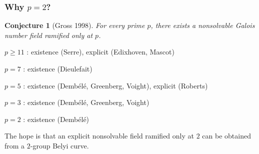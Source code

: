 \documentclass[handout, xcolor=dvipsnames]{beamer}
\theoremstyle{plain}
\newtheorem*{thm}{Theorem}
\newtheorem*{conj}{Conjecture}
\newcommand{\PP}{\mathbb P}
\begin{document}
  \begin{frame}[plain]
    \frametitle{Why $p=2$?}
    \begin{conj}[Gross 1998]
      For every prime $p$, there exists a nonsolvable Galois number field
      ramified only at $p$.
    \end{conj}
    \pause
    $p\geq 11$ : existence (Serre), explicit (Edixhoven, Mascot)
    \par
    $p=7$ : existence (Dieulefait)
    \par
    $p=5$ : existence (Demb\'{e}l\'{e}, Greenberg, Voight), explicit (Roberts)
    \par
    $p=3$ : existence (Demb\'{e}l\'{e}, Greenberg, Voight)
    \par
    $p=2$ : existence (Demb\'{e}l\'{e})
    \pause
    \par
    The hope is that an explicit nonsolvable field ramified only at $2$
    can be obtained from a $2$-group Belyi curve.
  \end{frame}
\end{document}

